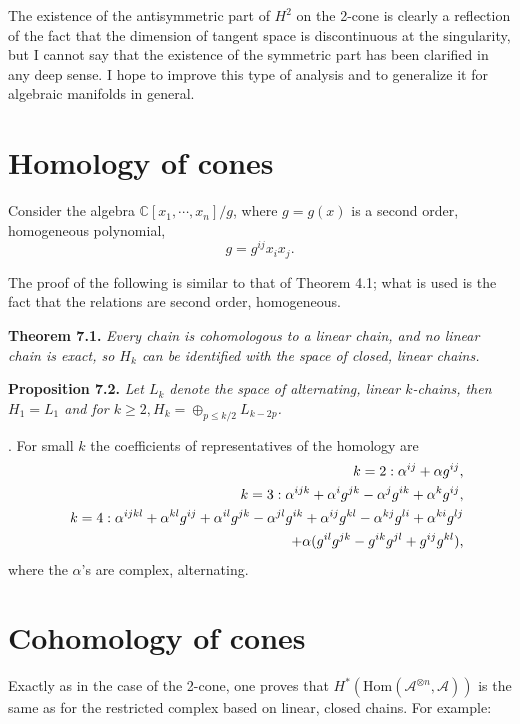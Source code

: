 \documentclass[a4paper,a4paper]{article}
\begin{document}
  The existence of the antisymmetric part of $H^2$
 on the 2-cone is clearly  a reflection of the fact that the
dimension of tangent space is discontinuous at the singularity, but I
cannot say that the existence of the symmetric part has been clarified in
any deep sense. I hope to improve this type of analysis and to 
generalize it for algebraic manifolds in general.
 
\section{Homology of cones}   %

Consider the algebra $\mathbb{C}[x_1,\cdots,x_n]/g$,
where $g = g(x)$ is a second order, homogeneous polynomial,
$$
g = g^{ij}x_ix_j.
$$

The proof of the following is similar to that of Theorem 4.1; what is used 
is the fact that the relations are second order, homogeneous.
\medskip

\noindent\textbf{Theorem 7.1.}  \textit{
Every  chain is cohomologous to a linear chain, and no linear chain is exact, 
so $H_k$ can be identified with the space of closed, linear chains. }
\medskip

\noindent\textbf{Proposition 7.2.} \textit{ 
Let $L_k$ denote the space of alternating, linear $k$-chains, 
then $H_1 = L_1$ and for $k \geq 2, H_k = \oplus_{p\leq k/2}L_{k-2p}$.}
\medskip

. For small $k$ the coefficients of representatives
of the homology are
\begin{eqnarray*}
&&k = 2: \alpha^{ij} + \alpha g^{ij},\\
&&k = 3: \alpha^{ijk} + \alpha^ig^{jk} - \alpha^jg^{ik} +
\alpha^kg^{ij},\\
&&k = 4: \alpha^{ijkl} + \alpha^{kl}g^{ij} + \alpha^{il}g^{jk} -
\alpha^{jl}g^{ik} + \alpha^{ij}g^{kl} - \alpha^{kj}g^{li} +
\alpha^{ki}g^{lj}\\
&&\hskip17.5mm  + \alpha(g^{il}g^{jk} - g^{ik}g^{jl} +
g^{ij}g^{kl}), %
\end{eqnarray*}
where the  $\alpha$'s are complex, alternating.

\section{Cohomology of cones} %

Exactly as in the case of the 2-cone, one proves that 
$H^*({\mathrm{Hom}}({\mathcal{A}}^{\otimes n},{\mathcal{A}}))$ 
is the same as for the restricted complex based on linear, closed
chains. For example:
\medskip
\end{document}
